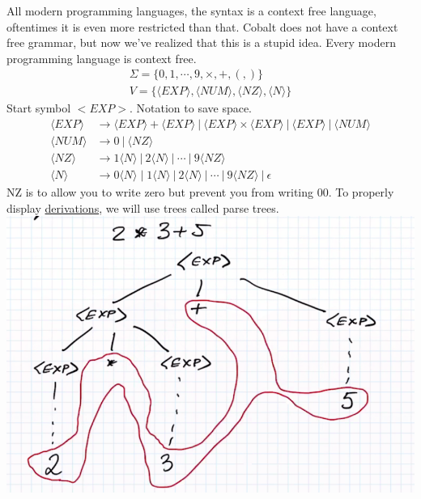 \documentclass[../598comp.tex]{subfiles}
\begin{document}
\begin{example}
  All modern programming languages, the syntax is a context free language,
  oftentimes it is even more restricted than that. Cobalt does not have a
  context free grammar, but now we've realized that this is a stupid idea. Every
  modern programming language is context free.
  \begin{gather*}
    \Sigma = \{0, 1, \cdots, 9, \times, +, (, )\} \\
    V = \{\langle EXP \rangle, \langle NUM \rangle, \langle NZ \rangle, \langle
    N \rangle\}
  \end{gather*}
  Start symbol $<EXP>$. Notation to save space.
  \begin{align*}
    \langle EXP \rangle &\to \langle EXP \rangle + \langle EXP \rangle \ | \
    \langle EXP \rangle \times \langle EXP \rangle \ | \ \langle EXP \rangle \ | \
    \langle NUM \rangle \\
    \langle NUM \rangle &\to 0 \ | \ \langle NZ \rangle \\
    \langle NZ \rangle &\to 1 \langle N \rangle \ | \ 2 \langle N \rangle \ | \
    \cdots \ | \ 9 \langle NZ \rangle \\
    \langle N \rangle &\to 0 \langle N \rangle \mid 1 \langle N \rangle \ | \ 2
    \langle N \rangle \ | \ \cdots \ | \ 9 \langle NZ \rangle \ | \ \epsilon
  \end{align*}
  NZ is to allow you to write zero but prevent you from writing 00. To properly
  display \ul{derivations}, we will use trees called parse trees.
  \\
  \includegraphics[width=\textwidth]{context_free_arithmetic_example.png}
\end{example}
\end{document}
